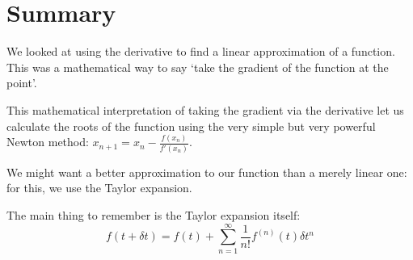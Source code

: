 \documentclass[12pt]{article}
\begin{document}
\section*{Summary}
We looked at using the derivative to find a linear approximation of a function. This was a mathematical way to say `take the gradient of the function at the point'.

This mathematical interpretation of taking the gradient via the derivative let us calculate the roots of the function using the very simple but very powerful Newton method: $x_{n+1} = x_n-\frac{f(x_n)}{f'(x_n)}$.

We might want a better approximation to our function than a merely linear one: for this, we use the Taylor expansion. 

The main thing to remember is the Taylor expansion itself:
\begin{equation}
  f(t+\delta t)=f(t)+\sum_{n=1}^\infty \frac{1}{n!}f^{(n)}(t)\delta t^n
\end{equation}
\end{document}

